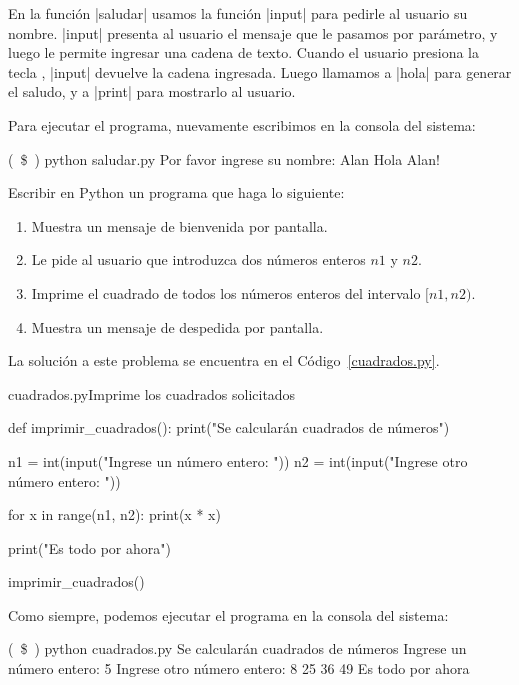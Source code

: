 En la función |saludar| usamos la función |input| para pedirle al usuario su
nombre. |input| presenta al usuario el mensaje que le pasamos por parámetro,
y luego le permite ingresar una cadena de texto. Cuando el usuario presiona la
tecla , |input| devuelve la cadena ingresada. Luego llamamos a
|hola| para generar el saludo, y a |print| para mostrarlo al usuario.

Para ejecutar el programa, nuevamente escribimos en la consola del sistema:

\begin{codigo-nohl-sn}
(~\$~) python saludar.py
Por favor ingrese su nombre: Alan
Hola Alan!
\end{codigo-nohl-sn}

\begin{problema}
Escribir en Python un programa que haga lo siguiente:

\begin{enumerate}
\item Muestra un mensaje de bienvenida por pantalla.
\item Le pide al usuario que introduzca dos números enteros $n1$ y $n2$.
\item Imprime el cuadrado de todos los números enteros del intervalo $[n1, n2)$.
\item Muestra un mensaje de despedida por pantalla.
\end{enumerate}
\end{problema}

\begin{solucion}
La solución a este problema se encuentra en el Código~\ref{cuadrados.py}.

\begin{codigo}{cuadrados.py}{Imprime los cuadrados solicitados}
\label{cuadrados.py}
\begin{codigo-python}
def imprimir_cuadrados():
    print("Se calcularán cuadrados de números")

    n1 = int(input("Ingrese un número entero: "))
    n2 = int(input("Ingrese otro número entero: "))

    for x in range(n1, n2):
        print(x * x)

    print("Es todo por ahora")

imprimir_cuadrados()
\end{codigo-python}
\end{codigo}

Como siempre, podemos ejecutar el programa en la consola del sistema:

\begin{codigo-nohl-sn}
(~\$~) python cuadrados.py
Se calcularán cuadrados de números
Ingrese un número entero: 5
Ingrese otro número entero: 8
25
36
49
Es todo por ahora
\end{codigo-nohl-sn}
\end{solucion}

